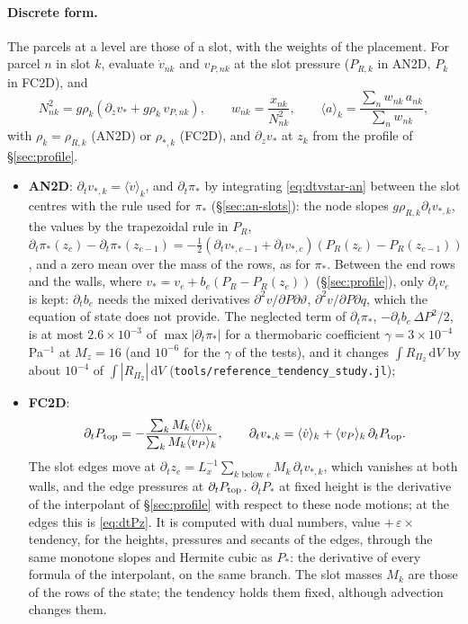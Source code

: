 \documentclass[11pt,a4paper]{article}
\newcommand{\vt}{\vartheta}
\newcommand{\code}[1]{\texttt{#1}}
\newcommand{\Ptop}{P_{\rm top}}
\begin{document}
\paragraph{Discrete form.} The parcels at a level are those of a slot, with the weights of the placement. For parcel $n$ in slot $k$,
evaluate $\dot v_{nk}$ and $v_{P,nk}$ at the slot pressure ($P_{R,k}$ in AN2D, $P_k$ in FC2D), and
\begin{equation}
  N^2_{nk}=g\rho_k\left(\partial_zv_*+g\rho_k\,v_{P,nk}\right),\qquad w_{nk}=\frac{x_{nk}}{N^2_{nk}},\qquad
  \langle a\rangle_k=\frac{\sum_nw_{nk}\,a_{nk}}{\sum_nw_{nk}},
\end{equation}
with $\rho_k=\rho_{R,k}$ (AN2D) or $\rho_{*,k}$ (FC2D), and $\partial_zv_*$ at $z_k$ from the profile of \S\ref{sec:profile}.
\begin{itemize}
  \item \textbf{AN2D}: $\partial_tv_{*,k}=\langle\dot v\rangle_k$, and $\partial_t\pi_*$ by integrating \eqref{eq:dtvstar-an}
        between the slot centres with the rule used for $\pi_*$ (\S\ref{sec:an-slots}): the node slopes $g\rho_{R,k}\partial_tv_{*,k}$,
        the values by the trapezoidal rule in $P_R$, $\partial_t\pi_*(z_c)-\partial_t\pi_*(z_{c-1})=-\tfrac12(\partial_tv_{*,c-1}+\partial_tv_{*,c})
        (P_R(z_c)-P_R(z_{c-1}))$, and a zero mean over the mass of the rows, as for $\pi_*$. Between the end rows and the walls,
        where $v_*=v_e+b_e(P_R-P_R(z_e))$ (\S\ref{sec:profile}), only $\partial_tv_e$ is kept: $\partial_tb_e$ needs the mixed
        derivatives $\partial^2v/\partial P\partial\vt$, $\partial^2v/\partial P\partial q$, which the equation of state does not
        provide. The neglected term of $\partial_t\pi_*$, $-\partial_tb_e\,\Delta P^2/2$, is at most $2.6\times10^{-3}$ of
        $\max|\partial_t\pi_*|$ for a thermobaric coefficient $\gamma=3\times10^{-4}$\,Pa$^{-1}$ at $M_z=16$ (and $10^{-6}$ for
        the $\gamma$ of the tests), and it changes $\int R_{\Pi_2}\,\mathrm dV$ by about $10^{-4}$ of $\int|R_{\Pi_2}|\,\mathrm dV$
        (\code{tools/reference\_tendency\_study.jl});
  \item \textbf{FC2D}:
        \begin{equation}
          \partial_t\Ptop=-\frac{\sum_kM_k\langle\dot v\rangle_k}{\sum_kM_k\langle v_P\rangle_k},\qquad
          \partial_tv_{*,k}=\langle\dot v\rangle_k+\langle v_P\rangle_k\,\partial_t\Ptop .
        \end{equation}
        The slot edges move at $\partial_tz_e=L_x^{-1}\sum_{k\text{ below }e}M_k\,\partial_tv_{*,k}$, which vanishes at both
        walls, and the edge pressures at $\partial_t\Ptop$. $\partial_tP_*$ at fixed height is the derivative of the
        interpolant of \S\ref{sec:profile} with respect to these node motions; at the edges this is \eqref{eq:dtPz}. It is
        computed with dual numbers, value $+\,\varepsilon\times$ tendency, for the heights, pressures and secants of the
        edges, through the same monotone slopes and Hermite cubic as $P_*$: the derivative of every formula of the
        interpolant, on the same branch. The slot masses $M_k$ are those of the rows of the state; the tendency holds them
        fixed, although advection changes them.
\end{itemize}
\end{document}
